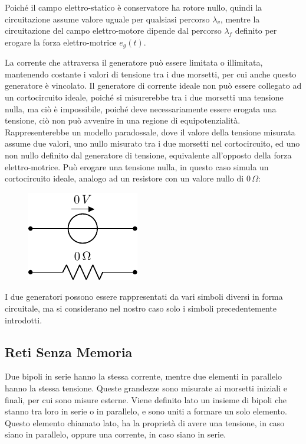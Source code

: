 \documentclass{article}
\numberwithin{equation}{subsection}
\begin{document}
Poiché il campo elettro-statico è conservatore ha rotore nullo, quindi la circuitazione assume valore uguale per qualsiasi percorso $\lambda_v$, mentre la circuitazione 
del campo elettro-motore dipende dal percorso $\lambda_f$ definito per erogare la forza elettro-motrice $e_g(t)$. 

La corrente che attraversa il generatore può essere limitata o illimitata, mantenendo costante i valori di tensione tra i due morsetti, per cui anche questo generatore è vincolato. 
Il generatore di corrente ideale non può essere collegato ad un cortocircuito ideale, poiché si misurerebbe tra i due morsetti una tensione nulla, ma ciò è impossibile, poiché 
deve necessariamente essere erogata una tensione, ciò non può avvenire in una regione di equipotenzialità. Rappresenterebbe un modello paradossale, dove il valore della 
tensione misurata assume due valori, uno nullo misurato tra i due morsetti nel cortocircuito, ed uno non nullo definito dal generatore di tensione, equivalente all'opposto 
della forza elettro-motrice. 
Può erogare una tensione nulla, in questo caso simula un cortocircuito ideale, analogo ad un resistore con un valore nullo di $0\,\Omega$: 
\begin{figure}[H]%
    \centering
    \includegraphics{cortocircuito.pdf}
    \label{fig:corcocircuito}
\end{figure}

I due generatori possono essere rappresentati da vari simboli diversi in forma circuitale, ma si considerano nel nostro caso solo i simboli precedentemente introdotti.  

\subsection{Reti Senza Memoria}

Due bipoli in serie hanno la stessa corrente, mentre due elementi in parallelo hanno la stessa tensione. Queste grandezze sono misurate ai morsetti iniziali e finali, per cui 
sono misure esterne. 
Viene definito lato un insieme di bipoli che stanno tra loro in serie o in parallelo, e sono uniti a formare un solo elemento. Questo elemento chiamato lato, ha la proprietà di avere 
una tensione, in caso siano in parallelo, oppure una corrente, in caso siano in serie. 
\end{document}

